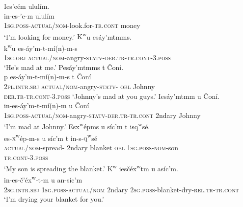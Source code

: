 \documentclass[output=paper,colorlinks,citecolor=brown]{langscibook}
\begin{document}
\ea 
\label{ex-thomason-24}
Ies{\textcrlambda}'e\textglotstop\'em ulul\'im.  \\
\gll in-es-{\textcrlambda}'e\textglotstop-m ulul\'im \\
\textsc{1sg}.\textsc{poss}-\textsc{actual/nom}-look.for-\textsc{tr.cont} money \\
\glt `I'm looking for money.'
\ex 
\label{ex-thomason-25}
{K\textsuperscript w}u es\'ay'mtmms. \\
\gll  
{k\textsuperscript w}u es-\textrevglotstop\'ay'm-t-m\'i(n)-m-s \\
\textsc{1sg}.\textsc{obj} \textsc{actual/nom}-angry-\textsc{statv-der.tr-tr.cont}-3.\textsc{poss} \\
\glt `He's mad at me.'
\ex 
\label{ex-thomason-26}
Pes\'ay'mtmms t \v{C}on\'i.  \\
\gll p es-\textrevglotstop\'ay'm-t-m\'i(n)-m-s t \v{C}on\'i \\
\textsc{2pl}.\textsc{intr.sbj} \textsc{actual/nom}-angry-\textsc{statv-}
 \textsc{obl} Johnny \\
\textsc{der.tr-tr.cont}-3.\textsc{poss}
\glt `Johnny's mad at you guys.' 
\ex 
\label{ex-thomason-27}
Ies\textrevglotstop\'ay'mtmm {\textltilde}u \v{C}on\'i. \\
\gll in-es-\textrevglotstop\'ay'm-t-m\'i(n)-m {\textltilde}u \v{C}on\'i \\ 
\textsc{1sg}.\textsc{poss}-\textsc{actual/nom}-angry-\textsc{statv-der.tr-tr.cont} 2ndary Johnny \\
\glt `I'm mad at Johnny.'
\ex 
\label{ex-thomason-28}
Es{x\textsuperscript w}\'epms {\textltilde}u s\'ic'm t is{q\textsuperscript w}s\'e{\textglotstop}. \\
 \gll es-{x\textsuperscript w}\'ep-m-s {\textltilde}u s\'ic'm t
   in-s-{q\textsuperscript w}s\'e{\textglotstop} \\
\textsc{actual/nom}-spread- 2ndary
blanket \textsc{obl} \textsc{1sg}.\textsc{poss}-\textsc{nom}-son\\
\textsc{tr.cont}-3.\textsc{poss} \\
 \glt `My son is spreading the blanket.'
\ex 
\label{ex-thomason-29}
{K\textsuperscript w} ies\v{c}\'e{x\textsuperscript w}{\textltilde}tm {\textltilde}u as\'ic'm. \\
    in-es-\v{c}'\'e{x\textsuperscript
 w}-{\textltilde}t-m {\textltilde}u an-s\'ic'm \\
\textsc{2sg}.\textsc{intr.sbj} \textsc{1sg}.\textsc{poss}-\textsc{actual/nom} 2ndary \textsc{2sg}.\textsc{poss}-blanket-dry-\textsc{rel.tr-tr.cont} \\
   \glt `I'm drying your blanket for you.'
\z
\end{document}
